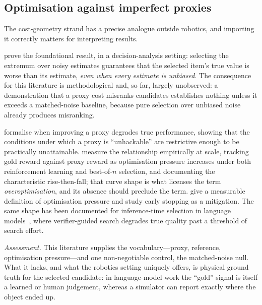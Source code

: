 \documentclass[11pt,letterpaper]{article}
\begin{document}
\subsection{Optimisation against imperfect proxies}\label{sec:lit-proxy}

The cost-geometry strand has a precise analogue outside robotics, and importing
it correctly matters for interpreting results.

\citet{smith2006optimizer} prove the foundational result, in a decision-analysis
setting: selecting the extremum over noisy estimates guarantees that the selected
item's true value is worse than its estimate, \emph{even when every estimate is
unbiased}. The consequence for this literature is methodological and, so far,
largely unobserved: a demonstration that a proxy cost misranks candidates
establishes nothing unless it exceeds a matched-noise baseline, because pure
selection over unbiased noise already produces misranking.

\citet{skalse2022defining} formalise when improving a proxy degrades true
performance, showing that the conditions under which a proxy is
``unhackable'' are restrictive enough to be practically unattainable.
\citet{gao2023overopt} measure the relationship empirically at scale, tracking
gold reward against proxy reward as optimisation pressure increases under both
reinforcement learning and best-of-$n$ selection, and documenting the
characteristic rise-then-fall; that curve shape is what licenses the term
\emph{overoptimisation}, and its absence should preclude the term.
\citet{karwowski2024goodhart} give a measurable definition of optimisation
pressure and study early stopping as a mitigation. The same shape has been
documented for inference-time selection in language
models~\citep{inferencetimehacking2025,gamingverifiers2026}, where verifier-guided
search degrades true quality past a threshold of search effort.

\emph{Assessment.} This literature supplies the vocabulary---proxy, reference,
optimisation pressure---and one non-negotiable control, the matched-noise null.
What it lacks, and what the robotics setting uniquely offers, is physical ground
truth for the selected candidate: in language-model work the ``gold'' signal is
itself a learned or human judgement, whereas a simulator can report exactly where
the object ended up.

\end{document}
